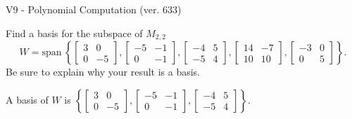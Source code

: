 \begin{exercise}
  \begin{exerciseTitle}V9 - Polynomial Computation (ver. 633)\end{exerciseTitle}
  \begin{exerciseStatement}
    Find a basis for the subspace of \(M_{2,2}\) 
\[W=\mathrm{span}\ \left\{\left[\begin{array}{cc}
3 & 0 \\
0 & -5
\end{array}\right] , \left[\begin{array}{cc}
-5 & -1 \\
0 & -1
\end{array}\right] , \left[\begin{array}{cc}
-4 & 5 \\
-5 & 4
\end{array}\right] , \left[\begin{array}{cc}
14 & -7 \\
10 & 10
\end{array}\right] , \left[\begin{array}{cc}
-3 & 0 \\
0 & 5
\end{array}\right]\right\}.\]
 Be sure to explain why your result is a basis.


  \end{exerciseStatement}
  \begin{exerciseAnswer}
   A basis of \(W\) is  \(\left\{\left[\begin{array}{cc}
3 & 0 \\
0 & -5
\end{array}\right] , \left[\begin{array}{cc}
-5 & -1 \\
0 & -1
\end{array}\right] , \left[\begin{array}{cc}
-4 & 5 \\
-5 & 4
\end{array}\right]\right\}\).
  


  \end{exerciseAnswer}
\end{exercise}